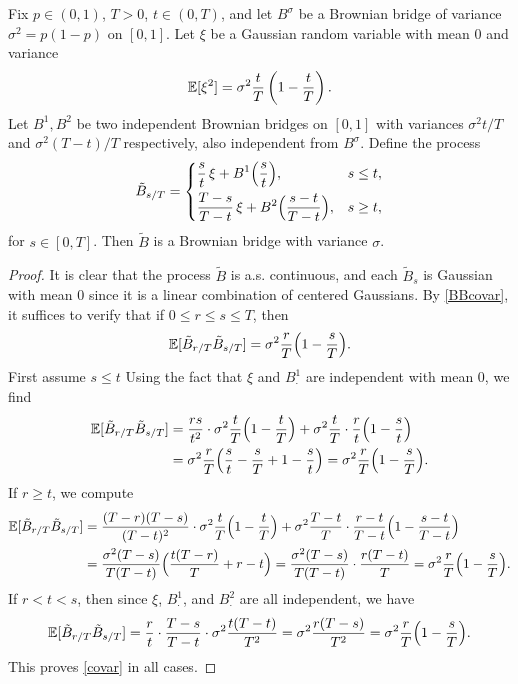 \begin{lemma}\label{2bridges}
	Fix $p\in (0,1)$, $T>0$, $t\in(0,T)$, and let $B^\sigma$ be a Brownian bridge of variance $\sigma^2 = p(1-p)$ on $[0,1]$. Let $\xi$ be a Gaussian random variable with mean 0 and variance
	\[
	\mathbb{E}[\xi^2] = \sigma^2\frac{t}{T}\left(1-\frac{t}{T}\right).
	\]
	Let $B^1,B^2$ be two independent Brownian bridges on $[0,1]$ with variances $\sigma^2 t/T$ and $\sigma^2(T-t)/T$ respectively, also independent from $B^\sigma$. Define the process
	\[
	\tilde{B}_{s/T} = \begin{dcases}
	\frac{s}{t}\,\xi + B^1\Big(\frac{s}{t}\Big), & s\leq t,\\
	\frac{T-s}{T-t}\,\xi + B^2\Big(\frac{s-t}{T-t}\Big), & s\geq t,
	\end{dcases}
	\]
	for $s\in [0,T]$. Then $\tilde{B}$ is a Brownian bridge with variance $\sigma$.
\end{lemma}

\begin{proof}
	It is clear that the process $\tilde{B}$ is a.s. continuous, and each $\tilde{B}_s$ is Gaussian with mean 0 since it is a linear combination of centered Gaussians. By \ref{BBcovar}, it suffices to verify that if $0\leq r\leq s\leq T$, then
	\begin{equation}\label{covar}
	\mathbb{E}[\tilde{B}_{r/T}\tilde{B}_{s/T}] = \sigma^2 \frac{r}{T}\Big(1-\frac{s}{T}\Big).
	\end{equation}
	First assume $s\leq t$ Using the fact that $\xi$ and $B^1_\cdot$ are independent with mean 0, we find
	\begin{align*}
	\mathbb{E}[\tilde{B}_{r/T}\tilde{B}_{s/T}] &= \frac{rs}{t^2}\cdot\sigma^2\frac{t}{T}\Big(1-\frac{t}{T}\Big) + \sigma^2\frac{t}{T}\cdot\frac{r}{t}\Big(1-\frac{s}{t}\Big)\\
	&= \sigma^2\frac{r}{T}\Big(\frac{s}{t} - \frac{s}{T} + 1 - \frac{s}{t}\Big) = \sigma^2\frac{r}{T}\Big(1-\frac{s}{T}\Big).
	\end{align*}
	If $r\geq t$, we compute
	\begin{align*}
	\mathbb{E}[\tilde{B}_{r/T}\tilde{B}_{s/T}] &= \frac{(T-r)(T-s)}{(T-t)^2}\cdot\sigma^2\frac{t}{T}\Big( 1 - \frac{t}{T}\Big) + \sigma^2\frac{T-t}{T}\cdot\frac{r-t}{T-t}\Big( 1 - \frac{s-t}{T-t}\Big)\\
	&= \frac{\sigma^2(T-s)}{T(T-t)}\Big(\frac{t(T-r)}{T} + r-t\Big) = \frac{\sigma^2(T-s)}{T(T-t)}\cdot\frac{r(T-t)}{T} = \sigma^2\frac{r}{T}\Big(1-\frac{s}{T}\Big).
	\end{align*}
	If $r < t < s$, then since $\xi$, $B^1_\cdot$, and $B^2_\cdot$ are all independent, we have
	\[
	\mathbb{E}[\tilde{B}_{r/T}\tilde{B}_{s/T}] = \frac{r}{t}\cdot\frac{T-s}{T-t}\cdot\sigma^2\frac{t(T-t)}{T^2} = \sigma^2\frac{r(T-s)}{T^2} = \sigma^2\frac{r}{T}\Big(1-\frac{s}{T}\Big).
	\]
	This proves \eqref{covar} in all cases.
\end{proof}

